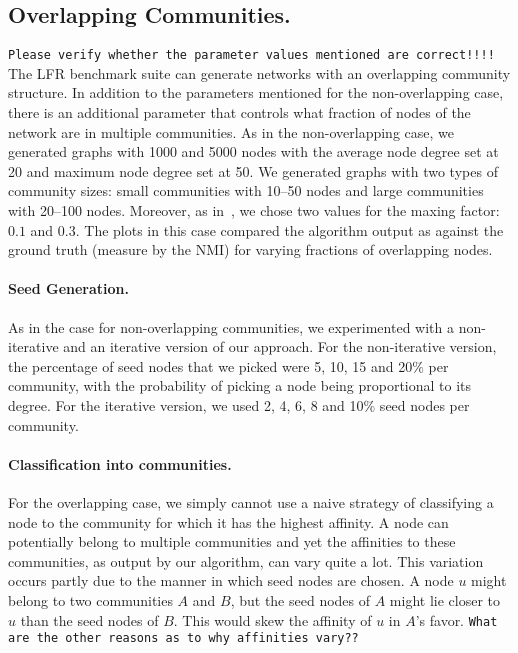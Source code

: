 \subsection{Overlapping Communities.}
\texttt{Please verify whether the parameter values mentioned are correct!!!!}
The LFR benchmark suite can generate networks with an overlapping community structure. 
In addition to the parameters mentioned for the non-overlapping case, there is an additional 
parameter that controls what fraction of nodes of the network are in multiple communities. 
As in the non-overlapping case, we generated graphs with 1000 and 5000 nodes with the average
node degree set at 20 and maximum node degree set at 50. We generated graphs with two types 
of community sizes: small communities with 10--50 nodes and large communities with 20--100 nodes.
Moreover, as in~\cite{LF09}, we chose two values for the maxing factor: $0.1$ and $0.3$. 
The plots in this case compared the algorithm output as against the ground truth (measure by 
the NMI) for varying fractions of overlapping nodes. 

\paragraph{Seed Generation.}
As in the case for non-overlapping communities, we experimented with a non-iterative 
and an iterative version of our approach. For the non-iterative version, the percentage 
of seed nodes that we picked were 5, 10, 15 and 20$\%$ per community, with the probability
of picking a node being proportional to its degree. For the iterative version, we used 
2, 4, 6, 8 and 10$\%$ seed nodes per community. 

\paragraph{Classification into communities.} For the overlapping case, we simply 
cannot use a naive strategy of classifying a node to the community for which it has 
the highest affinity. A node can potentially belong to multiple communities and yet 
the affinities to these communities, as output by our algorithm, can vary quite a lot. 
This variation occurs partly due to the manner in which seed nodes are chosen. A node $u$ might 
belong to two communities $A$ and $B$, but the seed nodes of $A$ might lie closer to $u$ than the 
seed nodes of $B$. This would skew the affinity of $u$ in $A$'s favor. \texttt{What are the other reasons 
as to why affinities vary??}

